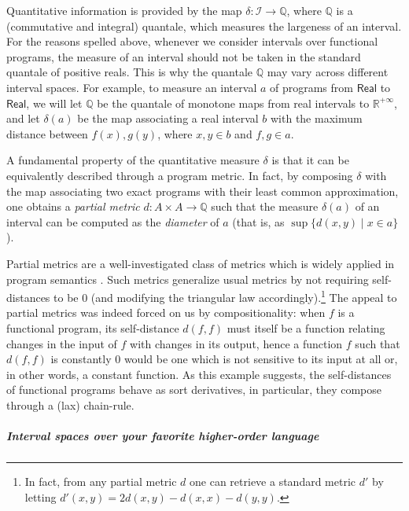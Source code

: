 Quantitative information is provided by the map $\delta: \mathcal I\to \mathbb Q$, where $\mathbb Q$ is a (commutative and integral) quantale, which measures the largeness of an interval. 
For the reasons spelled above, whenever we consider intervals over functional programs, the measure of an interval should not be taken in the standard quantale of positive reals. This is why the quantale $\mathbb Q$ may vary across different interval spaces. For example, to measure an interval $a$ of programs from $\mathsf{Real}$ to $\mathsf{Real}$, we will let $\mathbb Q$ be the quantale of monotone maps from real intervals to $\mathbb R^{+\infty}$, and let $\delta(a)$ be the map associating a real interval $b$ with the maximum distance between $f(x),g(y)$, where $x,y\in b$ and $f,g\in a$.  

A fundamental property of the quantitative measure $\delta$ is that it can be equivalently described through a program metric. In fact, by composing $\delta$ with the map associating two exact programs with their least common approximation, one obtains a \emph{partial metric} $d: A\times A \to \mathbb{Q}$ such that the measure $\delta(a)$ of an interval can be computed as the \emph{diameter} of $a$ (that is, as $\sup\{d(x,y)\mid x\in a\}$).
%


 Partial metrics are a well-investigated class of metrics which is widely applied in program semantics \cite{bkmp:partial-metrics, doi:10.1111/j.1749-6632.1994.tb44144.x, Samet:2013aa}. 
Such metrics generalize usual metrics by not requiring self-distances to be $0$ (and modifying the triangular law accordingly).\footnote{In fact, from any partial metric $d$ one can retrieve a standard metric $d'$ by letting $d'(x,y)=2d(x,y)-d(x,x)-d(y,y)$.}
The appeal to partial metrics was indeed forced on us by compositionality: when $f$ is a functional program, its self-distance $d(f,f)$ must itself be a function relating changes in the input of $f$ with changes in its output, hence a function $f$ such that $d(f,f)$ is constantly $0$ would be one which is not sensitive to its input at all or, in other words, a constant function.   
 As this example suggests, the self-distances of functional programs behave as sort derivatives, in particular, they compose through a (lax) chain-rule.

      
\subparagraph*{Interval spaces over your favorite higher-order language }


